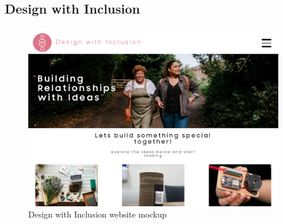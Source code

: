 \subsection{Design with Inclusion}
\label{FutureStudyTwo}
\begin{figure}[htp]
\centering
\includegraphics[width=1\linewidth]{Images/Discussion/Design_For_Inclusion.png}
\caption{Design with Inclusion website mockup}
\label{fig:DesignInclusion}
\end{figure}
